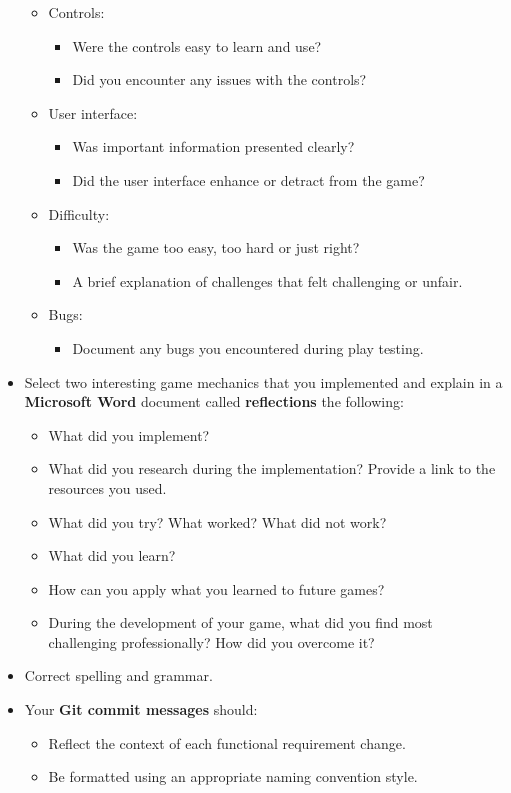 \documentclass{article}
\begin{document}
\begin{itemize}
\begin{itemize}
		\item Controls:
		\begin{itemize}
			\item Were the controls easy to learn and use?
			\item Did you encounter any issues with the controls?
		\end{itemize}
		\item User interface:
		\begin{itemize}
			\item Was important information presented clearly?
			\item Did the user interface enhance or detract from the game?
		\end{itemize}
		\item Difficulty:
		\begin{itemize}
			\item Was the game too easy, too hard or just right?
			\item A brief explanation of challenges that felt challenging or unfair. 
		\end{itemize}
		\item Bugs:
		\begin{itemize}
			\item Document any bugs you encountered during play testing.
		\end{itemize}
	\end{itemize}
	\item Select two interesting game mechanics that you implemented and explain in a \textbf{Microsoft Word} document called \textbf{reflections} the following:
	\begin{itemize}
		\item What did you implement?
		\item What did you research during the implementation? Provide a link to the resources you used.
		\item What did you try? What worked? What did not work?
		\item What did you learn?
		\item How can you apply what you learned to future games?
		\item During the development of your game, what did you find most challenging professionally? How did you overcome it?
	\end{itemize}
	\item Correct spelling and grammar.
	\item Your \textbf{Git commit messages} should:
	\begin{itemize}
		\item Reflect the context of each functional requirement change.
		\item Be formatted using an appropriate naming convention style.
	\end{itemize}
\end{itemize} 
\end{document}
